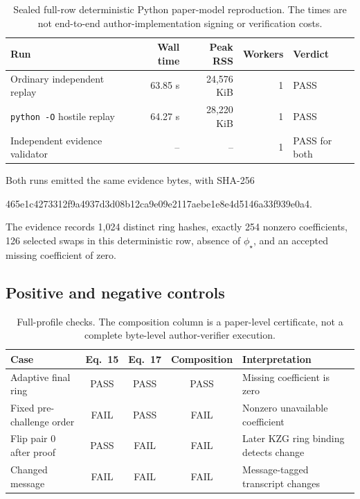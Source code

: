 \documentclass[10pt,a4paper]{article}
\begin{document}
\begin{table}[h]
\centering
\small
\begin{tabular}{@{}lrrrl@{}}
\toprule
Run & Wall time & Peak RSS & Workers & Verdict \\
\midrule
Ordinary independent replay & 63.85 s & 24,576 KiB & 1 & PASS \\
\texttt{python -O} hostile replay & 64.27 s & 28,220 KiB & 1 & PASS \\
Independent evidence validator & -- & -- & 1 & PASS for both \\
\bottomrule
\end{tabular}
\caption{Sealed full-row deterministic Python paper-model reproduction. The
times are not end-to-end author-implementation signing or verification costs.}
\end{table}

Both runs emitted the same evidence bytes, with SHA-256
\begin{center}
\small\ttfamily
465e1c4273312f9a4937d3d08b12ca9e09e2117aebe1e8e4d5146a33f939e0a4.
\end{center}
The evidence records 1,024 distinct ring hashes, exactly 254 nonzero
coefficients, 126 selected swaps in this deterministic row, absence of
$\phi_\star$, and an accepted missing coefficient of zero.

\subsection{Positive and negative controls}

\begin{table}[h]
\centering
\small
\begin{tabularx}{\textwidth}{@{}lcccX@{}}
\toprule
Case & Eq.~15 & Eq.~17 & Composition & Interpretation \\
\midrule
Adaptive final ring & PASS & PASS & PASS & Missing coefficient is zero \\
Fixed pre-challenge order & FAIL & PASS & FAIL & Nonzero unavailable coefficient \\
Flip pair 0 after proof & PASS & FAIL & FAIL & Later KZG ring binding detects change \\
Changed message & FAIL & FAIL & FAIL & Message-tagged transcript changes \\
\bottomrule
\end{tabularx}
\caption{Full-profile checks. The composition column is a paper-level
certificate, not a complete byte-level author-verifier execution.}
\end{table}
\end{document}
